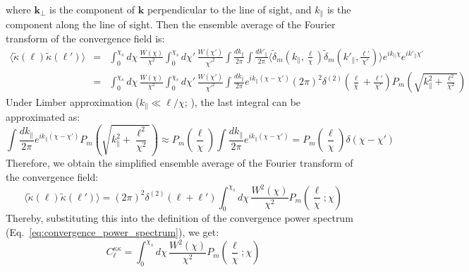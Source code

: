 where \( \mathbf{k}_\perp \) is the component of \( \mathbf{k} \) perpendicular to the line of sight, and \( k_\parallel \) is the component along the line of sight.
Then the ensemble average of the Fourier transform of the convergence field is:
\begin{eqnarray}
    \langle \tilde{\kappa}(\boldsymbol{\ell}) \tilde{\kappa}(\boldsymbol{\ell}') \rangle &=& \int_0^{\chi_s} d\chi \, \frac{W(\chi)}{\chi^2} \int_0^{\chi_s} d\chi' \, \frac{W(\chi')}{\chi'^2} \int \frac{dk_\parallel}{2\pi} \int \frac{dk'_\parallel}{2\pi} \langle \tilde{\delta}_m\left(k_\parallel, \frac{\boldsymbol{\ell}}{\chi}\right) \tilde{\delta}_m\left(k'_\parallel, \frac{\boldsymbol{\ell}'}{\chi'}\right) \rangle e^{i k_\parallel \chi} e^{i k'_\parallel \chi'} \nonumber \\
    &=& \int_0^{\chi_s} d\chi \, \frac{W(\chi)}{\chi^2} \int_0^{\chi_s} d\chi' \, \frac{W(\chi')}{\chi'^2} \int \frac{dk_\parallel}{2\pi} e^{i k_\parallel (\chi - \chi')} (2\pi)^2 \delta^{(2)}\left(\frac{\boldsymbol{\ell}}{\chi} + \frac{\boldsymbol{\ell}'}{\chi'}\right) P_m\left(\sqrt{k_\parallel^2 + \frac{\ell^2}{\chi^2}}\right) \nonumber
\end{eqnarray}
Under Limber approximation ($k_\parallel \ll \ell/\chi$; \citealp{1954ApJ...119..655L}), the last integral can be approximated as:
\begin{equation}
    \int \frac{dk_\parallel}{2\pi} e^{i k_\parallel (\chi - \chi')} P_m\left(\sqrt{k_\parallel^2 + \frac{\ell^2}{\chi^2}}\right) \approx P_m\left(\frac{\ell}{\chi}\right) \int \frac{dk_\parallel}{2\pi} e^{i k_\parallel (\chi - \chi')} = P_m\left(\frac{\ell}{\chi}\right) \delta(\chi - \chi')
\end{equation}
Therefore, we obtain the simplified ensemble average of the Fourier transform of the convergence field:
\begin{equation}
    \langle \tilde{\kappa}(\boldsymbol{\ell}) \tilde{\kappa}(\boldsymbol{\ell}') \rangle = (2\pi)^2 \delta^{(2)}(\boldsymbol{\ell} + \boldsymbol{\ell}') \int_0^{\chi_s} d\chi \, \frac{W^2(\chi)}{\chi^2} P_m\left(\frac{\ell}{\chi}; \chi\right)
    \label{eq:kappa_power_spectrum}
\end{equation}
Thereby, substituting this into the definition of the convergence power spectrum (Eq.~\eqref{eq:convergence_power_spectrum}), we get:
\begin{equation}
    C_{\ell}^{\kappa\kappa} = \int_0^{\chi_s} d\chi \, \frac{W^2(\chi)}{\chi^2} P_m\left(\frac{\ell}{\chi}; \chi\right)
    \label{eq:convergence_power_spectrum_final}
\end{equation}

